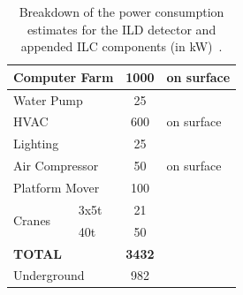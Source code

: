 \begin{table}[htb]
\begin{tabular}{l|l|c|c|c|c}
        \multicolumn{2}{l|}{Computer Farm}& 1000 & \multicolumn{3}{l}{on surface}\\ \hline
        \multicolumn{2}{l|}{Water Pump}& 25 & \multicolumn{3}{l}{}\\ \hline
        \multicolumn{2}{l|}{HVAC}& 600 & \multicolumn{3}{l}{on surface}\\ \hline
        \multicolumn{2}{l|}{Lighting}& 25 & \multicolumn{3}{l}{}\\ \hline
        \multicolumn{2}{l|}{Air Compressor}& 50 & \multicolumn{3}{l}{on surface}\\ \hline
        \multicolumn{2}{l|}{Platform Mover}& 100 & \multicolumn{3}{l}{}\\ \hline
        \multirow{2}{*}{Cranes} & 3x5t & 21 & \multicolumn{3}{l}{}\\
        & 40t & 50 & \multicolumn{3}{l}{}\\ \hline
        \multicolumn{2}{l|}{{\bf TOTAL}}& {\bf 3432} & \multicolumn{3}{l}{}\\ \hline
        \multicolumn{2}{l|}{Underground}& 982 & \multicolumn{3}{l}{}\\ \hline
    \end{tabular}
    \caption{Breakdown of the power consumption estimates for the ILD detector and appended ILC components (in kW)~\cite{ild:bib:services}.}
    \label{tab:integration:power}
\end{table}

